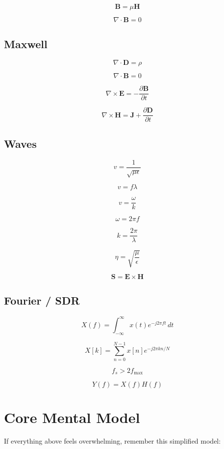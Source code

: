 \documentclass[11pt]{article}
\newcommand{\vect}[1]{\mathbf{#1}}
\begin{document}
\[
\boxed{
\vect{B}
=
\mu\vect{H}
}
\]

\[
\boxed{
\nabla\cdot\vect{B}
=
0
}
\]

\subsection*{Maxwell}

\[
\boxed{
\nabla\cdot\vect{D}
=
\rho
}
\]

\[
\boxed{
\nabla\cdot\vect{B}
=
0
}
\]

\[
\boxed{
\nabla\times\vect{E}
=
-\frac{\partial\vect{B}}{\partial t}
}
\]

\[
\boxed{
\nabla\times\vect{H}
=
\vect{J}
+
\frac{\partial\vect{D}}{\partial t}
}
\]

\subsection*{Waves}

\[
\boxed{
v
=
\frac{1}{\sqrt{\mu\epsilon}}
}
\]

\[
\boxed{
v=f\lambda
}
\]

\[
\boxed{
v=\frac{\omega}{k}
}
\]

\[
\boxed{
\omega=2\pi f
}
\]

\[
\boxed{
k=\frac{2\pi}{\lambda}
}
\]

\[
\boxed{
\eta
=
\sqrt{\frac{\mu}{\epsilon}}
}
\]

\[
\boxed{
\vect{S}
=
\vect{E}\times\vect{H}
}
\]

\subsection*{Fourier / SDR}

\[
\boxed{
X(f)
=
\int_{-\infty}^{\infty}
x(t)e^{-j2\pi ft}\,dt
}
\]

\[
\boxed{
X[k]
=
\sum_{n=0}^{N-1}
x[n]e^{-j2\pi kn/N}
}
\]

\[
\boxed{
f_s>2f_{\max}
}
\]

\[
\boxed{
Y(f)
=
X(f)H(f)
}
\]



\section{Core Mental Model}

If everything above feels overwhelming, remember this simplified model:
\end{document}
